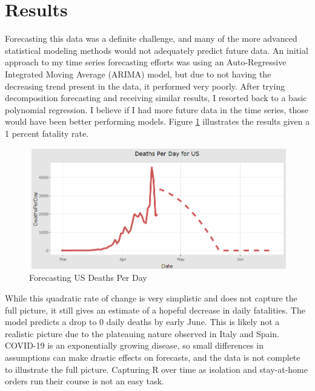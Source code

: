 \section{Results}
\label{Results}

Forecasting this data was a definite challenge, and many of the more advanced statistical modeling methods would not adequately predict future data.  An initial approach to my time series forecasting efforts was using an Auto-Regressive Integrated Moving Average (ARIMA) model, but due to not having the decreasing trend present in the data, it performed very poorly.  After trying decomposition forecasting and receiving similar results, I resorted back to a basic polynomial regression.  I believe if I had more future data in the time series, those would have been better performing models.  Figure \ref{modelACC} illustrates the results given a 1 percent fatality rate. 



\begin{figure}[ht]
\centerline{\includegraphics[scale=0.4]{Figures/Capture.PNG}}
\caption{Forecasting US Deaths Per Day}
\label{modelACC}
\end{figure}




While this quadratic rate of change is very simplistic and does not capture the full picture, it still gives an estimate of a hopeful decrease in daily fatalities.  The model predicts a drop to 0 daily deaths by early June.  This is likely not a realistic picture due to the plateauing nature observed in Italy and Spain. COVID-19 is an exponentially growing disease, so small differences in assumptions can make drastic effects on forecasts, and the data is not complete to illustrate the full picture.  Capturing R over time as isolation and stay-at-home orders run their course is not an easy task.  

